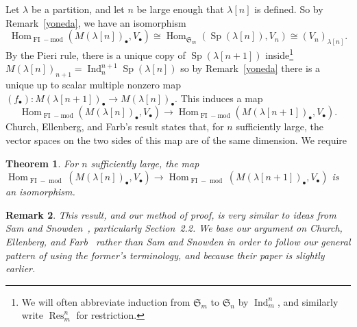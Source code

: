\documentclass[10pt]{amsart}
\DeclareMathOperator{\FI}{FI}
\DeclareMathOperator{\module}{mod}
\DeclareMathOperator{\Hom}{Hom}
\DeclareMathOperator{\Res}{Res}
\DeclareMathOperator{\Ind}{Ind}
\DeclareMathOperator{\Sp}{Sp}
\newcommand{\Sn}{\mathfrak{S}}
\newcommand{\dt}{\bullet}
\newtheorem{theorem}{Theorem}[section]
\newtheorem{remark}[theorem]{Remark}
\theoremstyle{definition}
\begin{document}
Let $\lambda$ be a partition, and let $n$ be large enough that $\lambda[n]$ is defined. 
So by Remark~\ref{yoneda}, we have an isomorphism
\[ \Hom_{\FI-\text{mod}}(M(\lambda[n])_\dt, V_\dt) \cong \Hom_{\Sn_m}(\Sp(\lambda[n]),V_n)\cong (V_n)_{\lambda[n]} . \]
By the Pieri rule, there is a unique copy of $\Sp(\lambda[n+1])$ inside\footnote{We will often abbreviate induction from $\Sn_m$ to $\Sn_n$ by $\Ind_m^n$, and similarly write $\Res_m^n$ for restriction.} $M(\lambda[n])_{n+1} = \Ind_n^{n+1} \Sp(\lambda[n])$ so by Remark~\ref{yoneda} there is a unique up to scalar multiple nonzero map $(f_\dt): M(\lambda[n+1])_\dt \to M(\lambda[n])_\dt$. This induces a map $$\Hom_{\FI-\text{mod}}(M(\lambda[n])_\dt, V_\dt) \to \Hom_{\FI-\text{mod}}(M(\lambda[n+1])_\dt, V_\dt).$$
Church, Ellenberg, and Farb's result states that, for $n$ sufficiently large, the vector spaces on the two sides of this map are of the same dimension. 
We require
\begin{theorem} \label{stabilization}
For $n$ sufficiently large, the map $\Hom_{\FI-\module}(M(\lambda[n])_\dt, V_\dt) \to \Hom_{\FI-\module}(M(\lambda[n+1])_\dt, V_\dt)$ is an isomorphism. 
\end{theorem}

\begin{remark}
This result, and our method of proof, is very similar to ideas from Sam and Snowden~\cite{SS}, particularly Section~2.2. We base our argument on Church, Ellenberg, and Farb~\cite{CEF} rather than Sam and Snowden in order to follow our general pattern of using the former's terminology, and because their paper is slightly earlier.
\end{remark}
\end{document}
